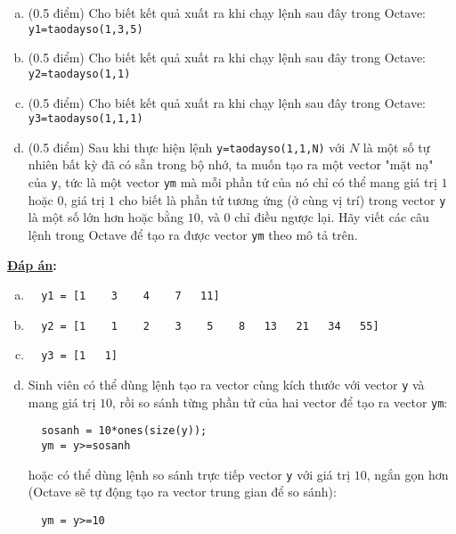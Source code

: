 \documentclass[12pt]{article}
\newcommand{\Solution}{
\medskip
{\bf \underline{Đáp án}:}
}
\begin{document}
\begin{enumerate}[a).]
 \item (0.5 điểm) Cho biết kết quả xuất ra khi chạy lệnh sau đây trong Octave: 
  \texttt{y1=taodayso(1,3,5)}
 \item (0.5 điểm) Cho biết kết quả xuất ra khi chạy lệnh sau đây trong Octave:
  \texttt{y2=taodayso(1,1)}
 \item (0.5 điểm) Cho biết kết quả xuất ra khi chạy lệnh sau đây trong Octave:
  \texttt{y3=taodayso(1,1,1)}
 \item (0.5 điểm) Sau khi thực hiện lệnh \texttt{y=taodayso(1,1,N)} với $N$ là một số tự nhiên bất kỳ đã có sẵn trong bộ nhớ, ta muốn tạo ra một vector "mặt nạ" của \texttt{y}, tức là một vector \texttt{ym} mà mỗi phần tử của nó chỉ có thể mang giá trị $1$ hoặc $0$, giá trị $1$ cho biết là phần tử tương ứng (ở cùng vị trí) trong vector \texttt{y} là một số lớn hơn hoặc bằng $10$, và $0$ chỉ điều ngược lại. Hãy viết các câu lệnh trong Octave để tạo ra được vector \texttt{ym} theo mô tả trên.
\end{enumerate}

\Solution 

\begin{enumerate}[a).]
 \item 
  \begin{verbatim}
  y1 = [1    3    4    7   11]
  \end{verbatim}
 \item 
  \begin{verbatim}
  y2 = [1    1    2    3    5    8   13   21   34   55]
  \end{verbatim}
 \item 
  \begin{verbatim}
  y3 = [1   1]
  \end{verbatim}
 \item Sinh viên có thể dùng lệnh tạo ra vector cùng kích thước với vector \texttt{y} và mang giá trị $10$, rồi so sánh từng phần tử của hai vector để tạo ra vector \texttt{ym}:
  \begin{verbatim}
  sosanh = 10*ones(size(y));
  ym = y>=sosanh
  \end{verbatim}
  hoặc có thể dùng lệnh so sánh trực tiếp vector \texttt{y} với giá trị $10$, ngắn gọn hơn (Octave sẽ tự động tạo ra vector trung gian để so sánh):
  \begin{verbatim}
  ym = y>=10
  \end{verbatim}
\end{enumerate}
\end{document}
